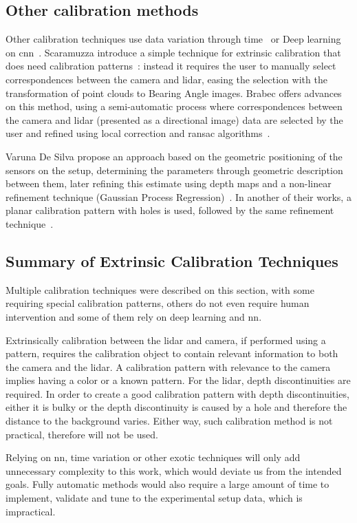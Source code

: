 \subsection{Other calibration methods}
Other calibration techniques use data variation through time~\cite{Chien2017} or Deep learning on \ac{cnn}~\cite{Wang2018a}. Scaramuzza \etal introduce a simple technique for extrinsic calibration that does need calibration patterns~\cite{Scaramuzza}: instead it requires the user to manually select correspondences between the camera and \ac{lidar}, easing the selection with the transformation of point clouds to Bearing Angle images. Brabec offers advances on this method, using a semi-automatic process where correspondences between the camera and \ac{lidar} (presented as a directional image) data are selected by the user and refined using local correction and \ac{ransac} algorithms~\cite{brabec2014}.

Varuna De Silva \etal propose an approach based on the geometric positioning of the sensors on the setup, determining the parameters through geometric description between them, later refining this estimate using depth maps and a non-linear refinement technique (Gaussian Process Regression)~\cite{DeSilva2018}. In another of their works, a planar calibration pattern with holes is used, followed by the same refinement technique~\cite{Silva2018}.


\subsection{Summary of Extrinsic Calibration Techniques}
Multiple calibration techniques were described on this section, with some requiring special calibration patterns, others do not even require human intervention and some of them rely on deep learning and \ac{nn}. 

Extrinsically calibration between the \ac{lidar} and camera, if performed using a pattern,  requires the calibration object to contain relevant information to both the camera and the \ac{lidar}. A calibration pattern with relevance to the camera implies having a color or a known pattern. For the \ac{lidar}, depth discontinuities are required. In order to create a good calibration pattern with depth discontinuities, either it is bulky or the depth discontinuity is caused by a hole and therefore the distance to the background varies. Either way, such calibration method is not practical, therefore will not be used.

Relying on \ac{nn}, time variation or other exotic techniques will only add unnecessary complexity to this work, which would deviate us from the intended goals. Fully automatic methods would also require a large amount of time to implement, validate and tune to the experimental setup data, which is impractical.

